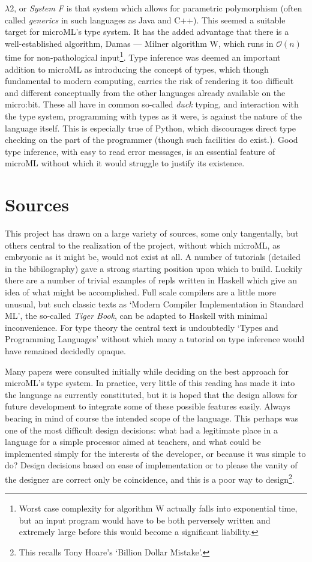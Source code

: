 \documentclass[12pt, a4paper]{report}
\begin{document}
$\lambda 2$, or \textit{System F} is that system which allows for parametric polymorphism (often
called \textit{generics} in such languages as Java and C++). This seemed a suitable target for
microML's type system. It has the added advantage that there is a well-established algorithm, Damas
--- Milner algorithm W, which runs in $\mathcal{O}(n)$ time for non-pathological input\footnote{Worst case
    complexity for algorithm W actually falls into exponential time, but an input program would have
    to be both perversely written and extremely large before this would become a significant
    liability.}. Type inference was deemed an important addition to microML as introducing the
concept of types, which though fundamental to modern computing, carries the risk of rendering it too
difficult and different conceptually from the other languages already available on the micro:bit.
These all have in common so-called \textit{duck} typing, and interaction with the type system,
programming with types as it were, is against the nature of the language itself. This is especially
true of Python, which discourages direct type checking on the part of the programmer (though such
facilities do exist.). Good type inference, with easy to read error messages, is an essential
feature of microML without which it would struggle to justify its existence.

\section{Sources}
This project has drawn on a large variety of sources, some only tangentally, but others central to
the realization of the project, without which microML, as embryonic as it might be, would not exist
at all. A number of tutorials (detailed in the bibilography) gave a strong starting position upon
which to build. Luckily there are a number of trivial examples of repls written in Haskell which
give an idea of what might be accomplished. Full scale compilers are a little more unusual, but such
classic texts as `Modern Compiler Implementation in Standard ML', the so-called \textit{Tiger Book},
can be adapted to Haskell with minimal inconvenience. For type theory the central text is
undoubtedly `Types and Programming Languages' without which many a tutorial on type inference would
have remained decidedly opaque.

Many papers were consulted initially while deciding on the best approach for microML's type system.
In practice, very little of this reading has made it into the language as currently constituted, but
it is hoped that the design allows for future development to integrate some of these possible
features easily. Always bearing in mind of course the intended scope of the language. This perhaps
was one of the most difficult design decisions: what had a legitimate place in a language for a
simple processor aimed at teachers, and what could be implemented simply for the interests of the
developer, or because it was simple to do? Design decisions based on ease of implementation or to
please the vanity of the designer are correct only be coincidence, and this is a poor way to
design\footnote{This recalls Tony Hoare's `Billion Dollar Mistake'.}.
\end{document}
